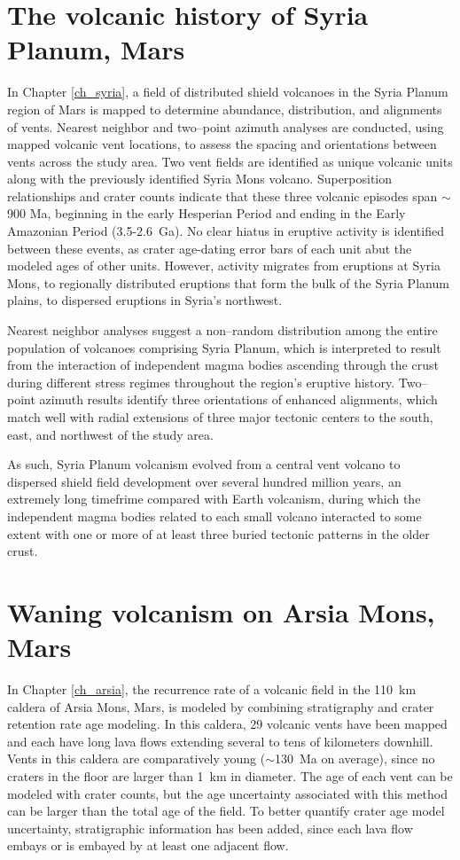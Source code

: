 \section{The volcanic history of Syria Planum, Mars}
In Chapter \ref{ch_syria}, a field of distributed shield volcanoes in the Syria Planum region of Mars is mapped to determine abundance, distribution, and alignments of vents. Nearest neighbor and two--point azimuth analyses are conducted, using mapped volcanic vent locations, to assess the spacing and orientations between vents across the study area. Two vent fields are identified as unique volcanic units along with the previously identified Syria Mons volcano. Superposition relationships and crater counts indicate that these three volcanic episodes span $\sim$900 Ma, beginning in the early Hesperian Period and ending in the Early Amazonian Period (3.5-2.6~Ga). No clear hiatus in eruptive activity is identified between these events, as crater age-dating error bars of each unit abut the modeled ages of other units. However, activity migrates from eruptions at Syria Mons, to regionally distributed eruptions that form the bulk of the Syria Planum plains, to dispersed eruptions in Syria's northwest. 

Nearest neighbor analyses suggest a non--random distribution among the entire population of volcanoes comprising Syria Planum, which is interpreted to result from the interaction of independent magma bodies ascending through the crust during different stress regimes throughout the region's eruptive history. Two--point azimuth results identify three orientations of enhanced alignments, which match well with radial extensions of three major tectonic centers to the south, east, and northwest of the study area. 

As such, Syria Planum volcanism evolved from a central vent volcano to dispersed shield field development over several hundred million years, an extremely long timefrime compared with Earth volcanism, during which the independent magma bodies related to each small volcano interacted to some extent with one or more of at least three buried tectonic patterns in the older crust.


\section{Waning volcanism on Arsia Mons, Mars}
In Chapter \ref{ch_arsia}, the recurrence rate of a volcanic field in the 110~km caldera of Arsia Mons, Mars, is modeled by combining stratigraphy and crater retention rate age modeling. In this caldera, 29 volcanic vents have been mapped and each have long lava flows extending several to tens of kilometers downhill. Vents in this caldera are comparatively young ($\sim$130~Ma on average), since no craters in the floor are larger than 1~km in diameter. The age of each vent can be modeled with crater counts, but the age uncertainty associated with this method can be larger than the total age of the field. To better quantify crater age model uncertainty, stratigraphic information has been added, since each lava flow embays or is embayed by at least one adjacent flow.

